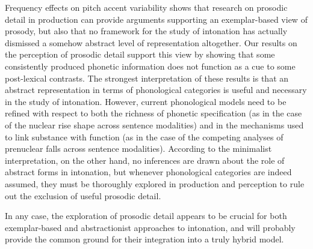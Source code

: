 Frequency effects on pitch accent variability shows that research on prosodic detail in production can provide arguments supporting an exemplar-based view of prosody, but also that no framework for the study of intonation has actually dismissed a somehow abstract level of representation altogether. Our results on the perception of prosodic detail support this view by showing that some consistently produced phonetic information does not function as a cue to some post-lexical contrasts. The strongest interpretation of these results is that an abstract representation in terms of phonological categories is useful and necessary in the study of intonation. However, current phonological models need to be refined with respect to both the richness of phonetic specification (as in the case of the nuclear rise shape across sentence modalities) and in the mechanisms used to link substance with function (as in the case of the competing analyses of prenuclear falls across sentence modalities). According to the minimalist interpretation, on the other hand, no inferences are drawn about the role of abstract forms in intonation, but whenever phonological categories are indeed assumed, they must be thoroughly explored in production and perception to rule out the exclusion of useful prosodic detail.

\enlargethispage{1em}In any case, the exploration of prosodic detail appears to be crucial for both exemplar-based and abstractionist approaches to intonation, and will probably provide the common ground for their integration into a truly hybrid model.